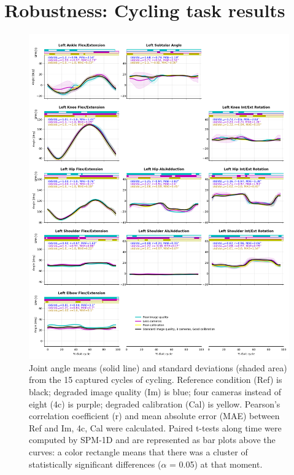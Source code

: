\clearpage
\section{Robustness: Cycling task results}

\begin{figure}[!ht]
	\centering
	\def\svgwidth{1\columnwidth}
	\fontsize{10pt}{10pt}\selectfont
	\includegraphics[height=\dimexpr\textheight-145pt]{"../Annexes/Figures/Fig_BikeRobust.png"}
	\caption{Joint angle means (solid line) and standard deviations (shaded area) from the 15 captured cycles of cycling. Reference condition (Ref) is black; degraded image quality (Im) is blue; four cameras instead of eight (4c) is purple; degraded calibration (Cal) is yellow. Pearson’s correlation coefficient (r) and mean absolute error (MAE) between Ref and Im, 4c, Cal were calculated. Paired t-tests along time were computed by SPM-1D and are represented as bar plots above the curves: a color rectangle means that there was a cluster of statistically significant differences (\(\alpha\) = 0.05) at that moment.}
	\label{fig_bikerobust}
\end{figure}


